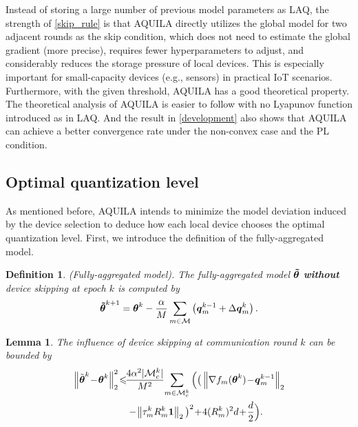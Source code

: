 \documentclass[lettersize,journal]{IEEEtran}
\newtheorem{definition}{Definition}
\newtheorem{lemma}{Lemma}
\begin{document}
Instead of storing a large number of previous model parameters as LAQ, the strength of \eqref{skip_rule} is that AQUILA directly utilizes the global model for two adjacent rounds as the skip condition, which does not need to estimate the global gradient (more precise), requires fewer hyperparameters to adjust, and considerably reduces the storage pressure of local devices. This is especially important for small-capacity devices (e.g., sensors) in practical IoT scenarios. Furthermore, with the given threshold, AQUILA has a good theoretical property. The theoretical analysis of AQUILA is easier to follow with no Lyapunov function introduced as in LAQ. And the result in \ref{development} also shows that AQUILA can achieve a better convergence rate under the non-convex case and the PL condition.

\subsection{Optimal quantization level}
As mentioned before, AQUILA intends to minimize the model deviation induced by the device selection to deduce how each local device chooses the optimal quantization level. First, we introduce the definition of the fully-aggregated model.
\begin{definition}(Fully-aggregated model). 
\textit{The fully-aggregated model $\boldsymbol{\Tilde{{\theta}}}$ \textbf{without} device skipping at epoch $k$ is computed by}
\begin{equation}
\boldsymbol{\Tilde{{\theta}}} ^{k+1} = \boldsymbol{\theta} ^{k}- \frac{\alpha}{M}\sum_{m \in \mathcal{M}}\left(\boldsymbol{q}_{m}^{k-1}+ \Delta \boldsymbol{q}_{m}^{k} \right).
\label{appendix1}
\end{equation}
\end{definition}
\begin{lemma}
    \textit{The influence of device skipping at communication round $k$ can be bounded by}
\begin{align}
\left\|\Tilde{\boldsymbol{\theta}}^k\!-\!\boldsymbol{\theta}^k\right\|_2^2 \!\leqslant&\!\frac{4\alpha^2|\mathcal{M}_c^k| }{M^2}\!\sum_{m \in \mathcal{M}_c^{k}} \Big( \big( \left\|\nabla f_m(\boldsymbol{\theta}^k)\!-\!\boldsymbol{q}_{m}^{k-1}\right\|_2\! \nonumber
\\
&-\!\left\|\tau_m^k R_m^k \boldsymbol{1}\right\|_2 \big)^2\!+\!4(R_m^k)^2 d\!+\!\frac{d}{2} \Big).
\end{align}
\label{lemma3.3}
\end{lemma}
\end{document}
